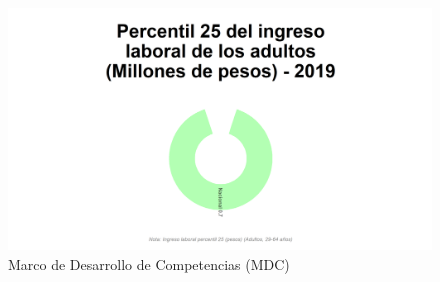 

\begin{figure}[H]
\caption{Marco de Desarrollo de Competencias (MDC) \label{map_result_2} }
\begin{center}
\includegraphics[width=\textwidth,keepaspectratio]{img/var_10_static.png}
\end{center}
\end{figure}